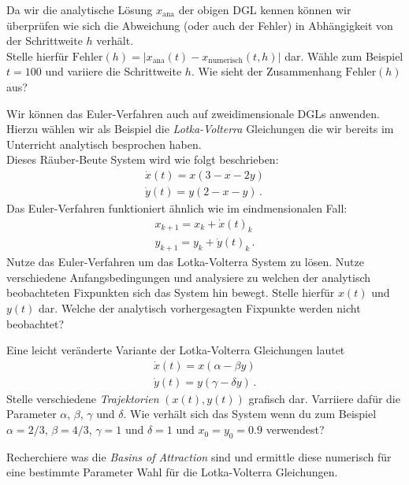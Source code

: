 \subexercise[%
  topic={Zusatz: Fehlerabschätzung des Euler Verfahren},
    ]

Da wir die analytische Lösung $x_{\mathrm{ana}}$ der obigen DGL kennen können wir überprüfen wie sich die Abweichung (oder auch der Fehler) in Abhängigkeit von der Schrittweite $h$ verhält.\\
Stelle hierfür $\mathrm{Fehler}(h)=|x_{\mathrm{ana}}(t) - x_{\mathrm{numerisch}}(t,h)|$ dar. Wähle zum Beispiel $t=100$ und variiere die Schrittweite $h$. Wie sieht der Zusammenhang $\mathrm{Fehler}(h)$ aus?

 \subexercise[%
  topic={Numerische Lösung der Lotka-Volterra Gleichungen},
    ]

Wir können das Euler-Verfahren auch auf zweidimensionale DGLs anwenden. Hierzu wählen wir als Beispiel die \emph{Lotka-Volterra} Gleichungen die wir bereits im Unterricht analytisch besprochen haben.\\
Dieses Räuber-Beute System wird wie folgt beschrieben:
\begin{align}
\dot x(t) = x(3-x-2y)\\
\dot y(t) = y(2-x-y)\,.
\end{align}
Das Euler-Verfahren funktioniert ähnlich wie im eindmensionalen Fall:
\begin{align}
x_{k+1} = x_{k} + \dot x(t)_{k} \\
y_{k+1} = y_{k} + \dot y(t)_{k}\,.
\end{align}
Nutze das Euler-Verfahren um das Lotka-Volterra System zu lösen. Nutze verschiedene Anfangsbedingungen und analysiere zu welchen der analytisch beobachteten Fixpunkten sich das System hin bewegt. Stelle hierfür $x(t)$ und $y(t)$ dar. Welche der analytisch vorhergesagten Fixpunkte werden nicht beobachtet?

\subexercise[%
  topic={Zusatz: Oszillationen im Lotka-Volterra System},
    ]
Eine leicht veränderte Variante der Lotka-Volterra Gleichungen lautet
\begin{align}
\dot x(t) = x(\alpha -\beta y)\\
\dot y(t) = y(\gamma -\delta y)\,.
\end{align}
Stelle verschiedene \emph{Trajektorien} $(x(t),y(t))$ grafisch dar. Varriiere dafür die Parameter $\alpha$, $\beta$, $\gamma$ und $\delta$. Wie verhält sich das System wenn du zum Beispiel $\alpha=2/3$, $\beta=4/3$, $\gamma=1$ und $\delta=1$ und $x_0=y_0=0.9$ verwendest?

\subexercise[%
  topic={Zusatz: \emph{Basins of Attraction} Lotka-Volterra System},
    ]
Recherchiere was die \emph{Basins of Attraction} sind und ermittle diese numerisch für eine bestimmte Parameter Wahl für die Lotka-Volterra Gleichungen.
